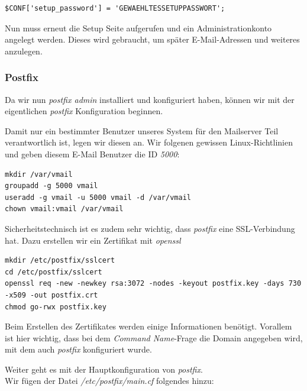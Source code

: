 \begin{lstlisting}
$CONF['setup_password'] = 'GEWAEHLTESSETUPPASSWORT';
\end{lstlisting}

Nun muss erneut die Setup Seite aufgerufen und ein Administrationkonto angelegt werden. Dieses wird gebraucht, um später E-Mail-Adressen und weiteres anzulegen.

\subsubsection{Postfix}
Da wir nun \textit{postfix admin} installiert und konfiguriert haben, können wir mit der eigentlichen \textit{postfix} Konfiguration beginnen.

Damit nur ein bestimmter Benutzer unseres System für den Mailserver Teil verantwortlich ist, legen wir diesen an. Wir folgenen gewissen Linux-Richtlinien und geben diesem E-Mail Benutzer die ID \textit{5000}:

\begin{lstlisting}
mkdir /var/vmail
groupadd -g 5000 vmail
useradd -g vmail -u 5000 vmail -d /var/vmail
chown vmail:vmail /var/vmail
\end{lstlisting}

Sicherheitstechnisch ist es zudem sehr wichtig, dass \textit{postfix} eine SSL-Verbindung hat. Dazu erstellen wir ein Zertifikat mit \textit{openssl}

\begin{lstlisting}
mkdir /etc/postfix/sslcert
cd /etc/postfix/sslcert
openssl req -new -newkey rsa:3072 -nodes -keyout postfix.key -days 730 -x509 -out postfix.crt
chmod go-rwx postfix.key
\end{lstlisting}

Beim Erstellen des Zertifikates werden einige Informationen benötigt. Vorallem ist hier wichtig, dass bei dem \textit{Command Name}-Frage die Domain angegeben wird, mit dem auch \textit{postfix} konfiguriert wurde.

Weiter geht es mit der Hauptkonfiguration von \textit{postfix}. \\
Wir fügen der Datei \textit{/etc/postfix/main.cf} folgendes hinzu:

